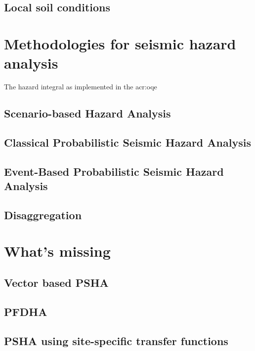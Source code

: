 \subsection{Local soil conditions}
%
\section{Methodologies for seismic hazard analysis}
The hazard integral as implemented in the \gls{acr:oqe}

\cite{cornell1968}
\cite{mcguire2004}
%
\subsection{Scenario-based Hazard Analysis}
%
%
\subsection{Classical Probabilistic Seismic Hazard Analysis}
%
\subsection{Event-Based Probabilistic Seismic Hazard Analysis}
%
\subsection{Disaggregation}
%
\section{What's missing}
\subsection{Vector based PSHA}
\subsection{PFDHA}
\subsection{PSHA using site-specific transfer functions}
